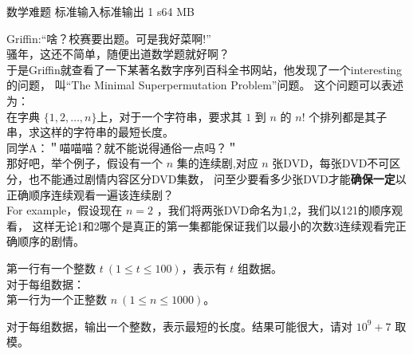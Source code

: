 \gdef\thisproblemauthor{Griffin}
\begin{problem}{数学难题}
{标准输入}{标准输出}
{1 s}{64 MB}{}

Griffin:``啥？校赛要出题。可是我好菜啊!''\\
骚年，这还不简单，随便出道数学题就好啊？\\
于是Griffin就查看了一下某著名数字序列百科全书网站，他发现了一个interesting的问题，
叫``The Minimal Superpermutation Problem''问题。
这个问题可以表述为：\\
在字典 $\{1,2,\ldots ,n\}$上，对于一个字符串，要求其 $1$ 到 $n$ 的 $n!$ 个排列都是其子串，求这样的字符串的最短长度。\\
同学A：＂喵喵喵？就不能说得通俗一点吗？＂\\
那好吧，举个例子，假设有一个 $n$ 集的连续剧,对应 $n$ 张DVD，每张DVD不可区分，也不能通过剧情内容区分DVD集数，
问至少要看多少张DVD才能\textbf{确保一定}以正确顺序连续观看一遍该连续剧？\\
For example，假设现在 $n=2$ ，我们将两张DVD命名为1,2，我们以121的顺序观看，
这样无论1和2哪个是真正的第一集都能保证我们以最小的次数3连续观看完正确顺序的剧情。

\InputFile

第一行有一个整数 $t\ (1 \le t \le 100)$，表示有 $t$ 组数据。\\
对于每组数据：\\
第一行为一个正整数 $n\ (1\le n\le 1000)。$

\OutputFile

对于每组数据，输出一个整数，表示最短的长度。结果可能很大，请对 $10^9+7$ 取模。

\Example

\begin{example}
%
\end{example}

\end{problem}
